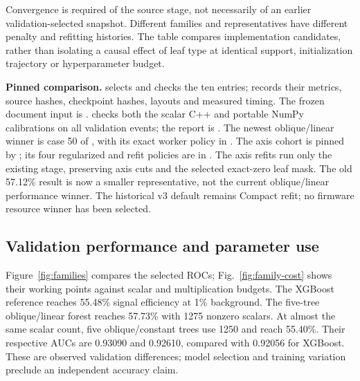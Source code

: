 Convergence is required of the source stage, not necessarily of an earlier
validation-selected snapshot. Different families and representatives have
different penalty and refitting histories. The table compares implementation
candidates, rather than isolating a causal effect of leaf type at identical
support, initialization trajectory or hyperparameter budget.

\begin{implementation}
\textbf{Pinned comparison.}
 selects and checks the ten entries;
 records their metrics,
source hashes, checkpoint hashes, layouts and measured timing.
The frozen document input is .
 checks both the scalar C++
and portable NumPy calibrations on all validation events; the report is
.
The newest oblique/linear winner is case 50 of
, with its exact worker policy in
. The axis cohort is pinned by
; its four regularized and refit policies
are in . The axis refits run only the existing
 stage, preserving axis cuts and the selected exact-zero leaf
mask. The old 57.12\% result is now a smaller representative, not the current
oblique/linear performance winner. The historical v3 default remains Compact
refit; no firmware resource winner has been selected.
\end{implementation}

\subsection{Validation performance and parameter use}
\label{sec:family-results}
Figure~\ref{fig:families} compares the selected ROCs; Fig.~\ref{fig:family-cost}
shows their working points against scalar and multiplication budgets.
The XGBoost reference reaches 55.48\% signal efficiency at 1\% background.
The five-tree oblique/linear forest reaches 57.73\% with 1275 nonzero scalars.
At almost the same scalar count, five oblique/constant trees use 1250 and
reach 55.40\%. Their respective AUCs are 0.93090 and 0.92610, compared with
0.92056 for XGBoost. These are observed validation differences; model
selection and training variation preclude an independent accuracy claim.

